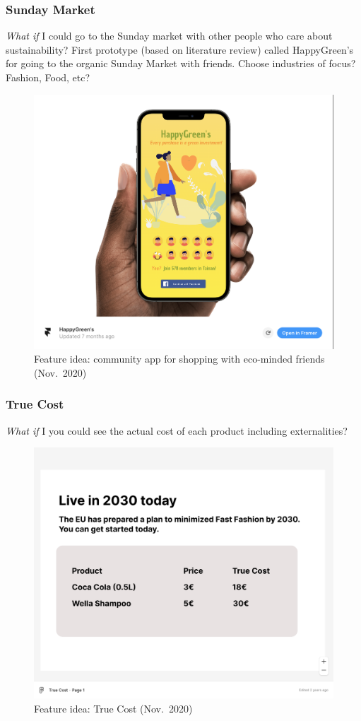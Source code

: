 \documentclass[
  12pt,
  letterpaper,
  DIV=11,
  numbers=noendperiod]{scrartcl}
\begin{document}
\subsubsection{Sunday Market}\label{sunday-market}

\emph{What if} I could go to the Sunday market with other people who
care about sustainability? First prototype (based on literature review)
called HappyGreen's for going to the organic Sunday Market with friends.
Choose industries of focus? Fashion, Food, etc?

\begin{figure}[H]

{\centering \includegraphics[width=0.5\linewidth,height=\textheight,keepaspectratio]{./images/prototypes/happygreen.png}

}

\caption{Feature idea: community app for shopping with eco-minded
friends (Nov.~2020)}

\end{figure}%

\subsubsection{True Cost}\label{true-cost}

\emph{What if} I you could see the actual cost of each product including
externalities?

\begin{figure}[H]

{\centering \includegraphics[width=0.5\linewidth,height=\textheight,keepaspectratio]{./images/prototypes/true-cost.png}

}

\caption{Feature idea: True Cost (Nov.~2020)}

\end{figure}%
\end{document}
